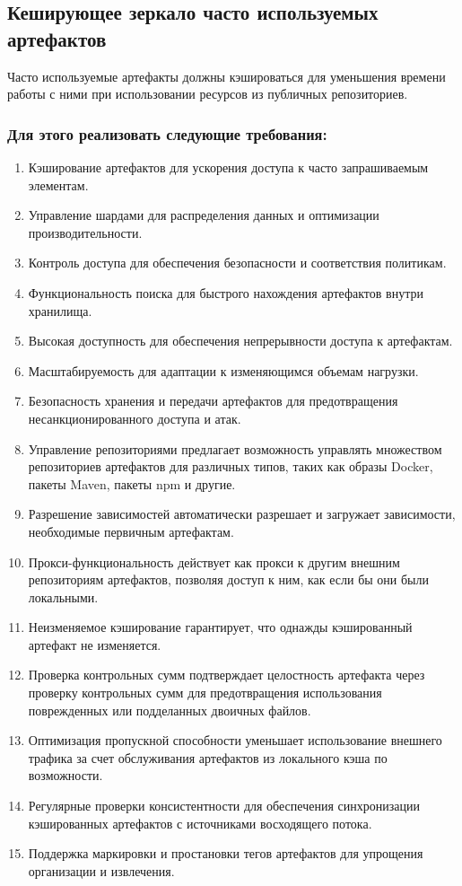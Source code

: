 \documentclass[14pt, a4paper]{extarticle}
\begin{document}
\subsection{Кеширующее зеркало часто используемых артефактов}

Часто используемые артефакты должны кэшироваться для уменьшения времени работы с ними при использовании ресурсов из публичных репозиториев.

\subsubsection*{Для этого реализовать следующие требования:}

\begin{enumerate}
\item Кэширование артефактов для ускорения доступа к часто запрашиваемым элементам.
\item Управление шардами для распределения данных и оптимизации производительности.
\item Контроль доступа для обеспечения безопасности и соответствия политикам.
\item Функциональность поиска для быстрого нахождения артефактов внутри хранилища.
\item Высокая доступность для обеспечения непрерывности доступа к артефактам.
\item Масштабируемость для адаптации к изменяющимся объемам нагрузки.
\item Безопасность хранения и передачи артефактов для предотвращения несанкционированного доступа и атак.
\item Управление репозиториями предлагает возможность управлять множеством репозиториев артефактов для различных типов, таких как образы Docker, пакеты Maven, пакеты npm и другие.
\item Разрешение зависимостей автоматически разрешает и загружает зависимости, необходимые первичным артефактам.
\item Прокси-функциональность действует как прокси к другим внешним репозиториям артефактов, позволяя доступ к ним, как если бы они были локальными.
\item Неизменяемое кэширование гарантирует, что однажды кэшированный артефакт не изменяется.
\item Проверка контрольных сумм подтверждает целостность артефакта через проверку контрольных сумм для предотвращения использования поврежденных или подделанных двоичных файлов.
\item Оптимизация пропускной способности уменьшает использование внешнего трафика за счет обслуживания артефактов из локального кэша по возможности.
\item Регулярные проверки консистентности для обеспечения синхронизации кэшированных артефактов с источниками восходящего потока.
\item Поддержка маркировки и простановки тегов артефактов для упрощения организации и извлечения.
\end{enumerate}
\end{document}
